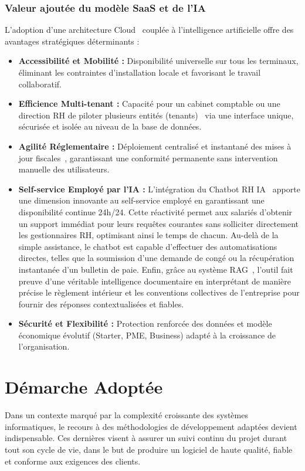 \subsubsection{Valeur ajoutée du modèle SaaS et de l'IA}
L'adoption d'une architecture Cloud~\cite{saas} couplée à l'intelligence artificielle offre des avantages stratégiques déterminants :
\begingroup
\begin{itemize}[label=\textbullet, leftmargin=1.5cm]
    \item \textbf{Accessibilité et Mobilité :} Disponibilité universelle sur tous les terminaux, éliminant les contraintes d'installation locale et favorisant le travail collaboratif.
    \item \textbf{Efficience Multi-tenant :} Capacité pour un cabinet comptable ou une direction RH de piloter plusieurs entités (tenants)~\cite{multitenant} via une interface unique, sécurisée et isolée au niveau de la base de données.
    \item \textbf{Agilité Réglementaire :} Déploiement centralisé et instantané des mises à jour fiscales~\cite{loifinance}, garantissant une conformité permanente sans intervention manuelle des utilisateurs.
    \item \textbf{Self-service Employé par l'IA :}
    L'intégration du Chatbot RH IA~\cite{chatbot_hr} apporte une dimension innovante au self-service employé en garantissant une disponibilité continue 24h/24. Cette réactivité permet aux salariés d'obtenir un support immédiat pour leurs requêtes courantes sans solliciter directement les gestionnaires RH, optimisant ainsi le temps de chacun. Au-delà de la simple assistance, le chatbot est capable d'effectuer des automatisations directes, telles que la soumission d'une demande de congé ou la récupération instantanée d'un bulletin de paie. Enfin, grâce au système RAG~\cite{rag_paper}, l'outil fait preuve d'une véritable intelligence documentaire en interprétant de manière précise le règlement intérieur et les conventions collectives de l'entreprise pour fournir des réponses contextualisées et fiables.
    \item \textbf{Sécurité et Flexibilité :} Protection renforcée des données et modèle économique évolutif (Starter, PME, Business) adapté à la croissance de l'organisation.
\end{itemize}
\endgroup

\section{Démarche Adoptée}\label{sec:demarche}
Dans un contexte marqué par la complexité croissante des systèmes informatiques, le recours à des méthodologies de développement adaptées devient indispensable. Ces dernières visent à assurer un suivi continu du projet durant tout son cycle de vie, dans le but de produire un logiciel de haute qualité, fiable et conforme aux exigences des clients.

